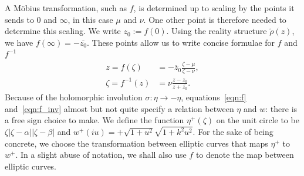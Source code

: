 \documentclass{article}
\numberwithin{equation}{section}
\numberwithin{figure}{section}
\renewcommand*{\bar}{\overline}
\newcommand{\abs}[1]{\left|#1\right|}
\DeclareMathOperator{\Real}{Re}
\DeclareMathOperator{\Imag}{Im}
\newcommand{\iu}{i}
\newcommand{\CP}{\mathbb{C}\text{P}}
\begin{document}
A M\"obius transformation, such as $f$, is determined up to scaling by the points it sends to $0$ and $\infty$, in this case $\mu$ and $\nu$. One other point is therefore needed to determine this scaling. We write $z_0 := f(0)$. Using the reality structure $\tilde{\rho}(z)$, we have $f(\infty) = -\bar{z_0}$. These points allow us to write concise formulae for $f$ and $f^{-1}$
\begin{align}
z = f(\zeta) &= -\bar{z}_0 \frac{\zeta - \mu}{\zeta - \nu},
\label{eqn:f} \\
\zeta = f^{-1}(z) &= \nu \frac{z - z_0}{z + \bar{z_0}}.
\label{eqn:f_inv}
\end{align}
Because of the holomorphic involution $\sigma: \eta\to-\eta$, equations~\eqref{eqn:f} and~\eqref{eqn:f_inv} almost but not quite specify a relation between $\eta$ and $w$: there is a free sign choice to make. 
We define the function $\eta^+(\zeta)$ on the unit circle to be $\zeta\abs{\zeta-\alpha}\abs{\zeta-\beta}$ and $w^+(\iu u) = + \sqrt{1+u^2}\sqrt{1+k^2u^2}$.
For the sake of being concrete, we choose the transformation between elliptic curves that maps $\eta^+$ to $w^+$.
In a slight abuse of notation, we shall also use $f$ to denote the map between elliptic curves.



    
    
\end{document}
